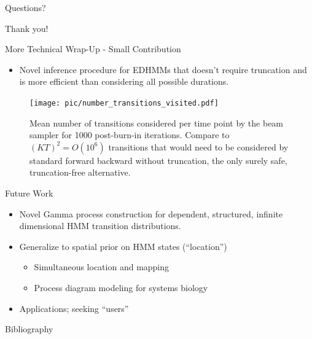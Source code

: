 \documentclass[xcolor=dvipsnames]{beamer}
\begin{document}
\begin{frame}[t]{Questions?}

Thank you!

\end{frame}

\begin{frame}[t]{More Technical Wrap-Up - Small Contribution}
\begin{itemize}
\item Novel inference procedure for EDHMMs that doesn't require truncation and is more efficient than considering all possible durations.
\end{itemize}
\begin{figure}
    \texttt{[image: pic/number\_transitions\_visited.pdf]}

\caption{Mean number of transitions considered per time point by the beam sampler for 1000 post-burn-in iterations. Compare to $(KT)^2 = O(10^6)$ transitions that would need to be considered by standard forward backward without truncation, the only surely safe, truncation-free alternative.}
\label{fig:allowed}
\end{figure}

\end{frame}

\begin{frame}[t]{Future Work}
\begin{itemize}
\item Novel Gamma process construction for dependent, structured, infinite dimensional HMM transition distributions.
\item Generalize to spatial prior on HMM states (``location'')
\begin{itemize}
\item Simultaneous location and mapping
\item Process diagram modeling for systems biology
\end{itemize}
\item Applications; seeking ``users''
\end{itemize}

\end{frame}





	
	\begin{frame}[t,allowframebreaks]{Bibliography}


\end{frame}
\end{document}
